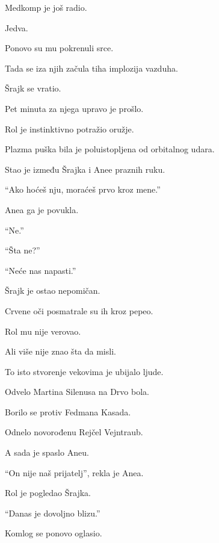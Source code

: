 Medkomp je još radio.

Jedva.

\bigskip

Ponovo su mu pokrenuli srce.

\bigskip

Tada se iza njih začula tiha implozija vazduha.

\bigskip

Šrajk se vratio.

\bigskip

Pet minuta za njega upravo je prošlo.

\bigskip

Rol je instinktivno potražio oružje.

Plazma puška bila je poluistopljena od orbitalnog udara.

\bigskip

Stao je između Šrajka i Anee praznih ruku.

``Ako hoćeš nju, moraćeš prvo kroz mene.''

\bigskip

Anea ga je povukla.

``Ne.''

``Šta ne?''

``Neće nas napasti.''

\bigskip

Šrajk je ostao nepomičan.

\bigskip

Crvene oči posmatrale su ih kroz pepeo.

\bigskip

Rol mu nije verovao.

Ali više nije znao šta da misli.

\bigskip

To isto stvorenje vekovima je ubijalo ljude.

Odvelo Martina Silenusa na Drvo bola.

Borilo se protiv Fedmana Kasada.

Odnelo novorođenu Rejčel Vejntraub.

\bigskip

A sada je spaslo Aneu.

\bigskip

``On nije naš prijatelj'', rekla je Anea.

Rol je pogledao Šrajka.

``Danas je dovoljno blizu.''

\bigskip

Komlog se ponovo oglasio.

